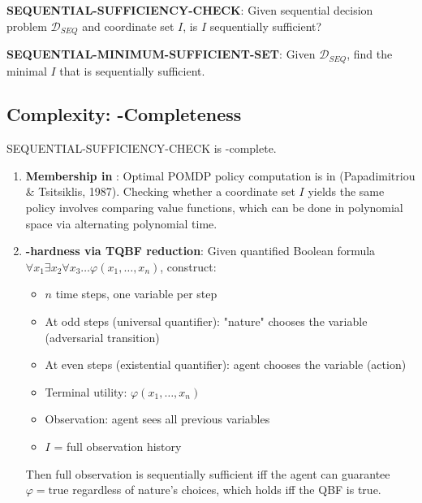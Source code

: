 \begin{decision}\label{dec:sequential-sufficiency-check}
\textbf{SEQUENTIAL-SUFFICIENCY-CHECK}: Given sequential decision problem $\mathcal{D}_{SEQ}$ and coordinate set $I$, is $I$ sequentially sufficient?
\end{decision}

\begin{decision}\label{dec:sequential-minsuff}
\textbf{SEQUENTIAL-MINIMUM-SUFFICIENT-SET}: Given $\mathcal{D}_{SEQ}$, find the minimal $I$ that is sequentially sufficient.
\end{decision}

\subsection{Complexity: \PSPACE-Completeness}

\begin{theorem}\label{th:sequential-sufficiency-pspace}
SEQUENTIAL-SUFFICIENCY-CHECK is \PSPACE-complete.
\end{theorem}

\begin{enumerate}
\item \textbf{Membership in \PSPACE}: Optimal POMDP policy computation is in \PSPACE (Papadimitriou \& Tsitsiklis, 1987). Checking whether a coordinate set $I$ yields the same policy involves comparing value functions, which can be done in polynomial space via alternating polynomial time.

\item \textbf{\PSPACE-hardness via TQBF reduction}: Given quantified Boolean formula $\forall x_1 \exists x_2 \forall x_3 \ldots \varphi(x_1, \ldots, x_n)$, construct:
\begin{itemize}
\item $n$ time steps, one variable per step
\item At odd steps (universal quantifier): "nature" chooses the variable (adversarial transition)
\item At even steps (existential quantifier): agent chooses the variable (action)
\item Terminal utility: $\varphi(x_1, \ldots, x_n)$
\item Observation: agent sees all previous variables
\item $I$ = full observation history
\end{itemize}
Then full observation is sequentially sufficient iff the agent can guarantee $\varphi = \text{true}$ regardless of nature's choices, which holds iff the QBF is true.
\end{enumerate}


